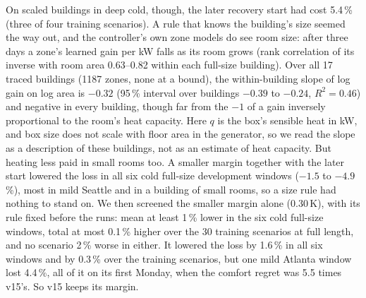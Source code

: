 \documentclass{article}
\begin{document}
On scaled buildings in deep cold, though, the later recovery start had cost 5.4\,\% (three of four training
scenarios). A rule that knows the building's size seemed the way out, and the controller's own zone models do see room
size: after three days a zone's learned gain per kW falls as its room grows (rank correlation of its inverse with room
area 0.63--0.82 within each full-size building). Over all 17 traced buildings (1187 zones, none at a bound), the
within-building slope of log gain on log area is $-0.32$ (95\,\% interval over buildings $-0.39$ to $-0.24$,
$R^2=0.46$) and negative in every building, though far from the $-1$ of a gain inversely proportional to the room's
heat capacity. Here $q$ is the box's sensible heat in kW, and box size does not scale with floor area in the generator,
so we read the slope as a description of these buildings, not as an estimate of heat capacity. But heating less paid in small rooms too. A smaller margin together
with the later start lowered the loss in all six cold full-size development windows ($-1.5$ to $-4.9$\,\%), most in
mild Seattle and in a building of small rooms, so a size rule had nothing to stand on. We then screened the smaller
margin alone (0.30\,K), with its rule fixed before the runs: mean at least 1\,\% lower in the six cold full-size
windows, total at most 0.1\,\% higher over the 30 training scenarios at full length, and no scenario 2\,\% worse in
either. It lowered the loss by 1.6\,\% in all six windows and by 0.3\,\% over the training scenarios, but one mild
Atlanta window lost 4.4\,\%, all of it on its first Monday, when the comfort regret was 5.5 times v15's. So v15 keeps
its margin.
\end{document}
